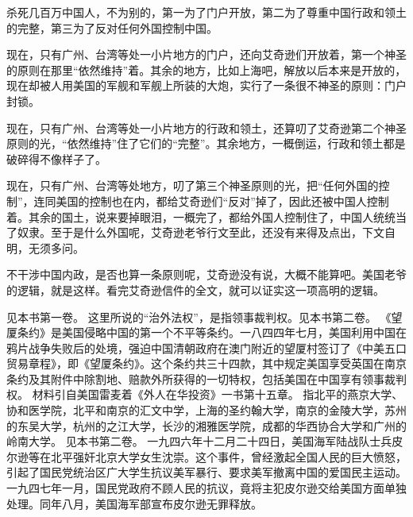 杀死几百万中国人，不为别的，第一为了门户开放，第二为了尊重中国行政和领土的完整，第三为了反对任何外国控制中国。

现在，只有广州、台湾等处一小片地方的门户，还向艾奇逊们开放着，第一个神圣的原则在那里“依然维持”着。其余的地方，比如上海吧，解放以后本来是开放的，现在却被人用美国的军舰和军舰上所装的大炮，实行了一条很不神圣的原则：门户封锁。

现在，只有广州、台湾等处一小片地方的行政和领土，还算叨了艾奇逊第二个神圣原则的光，“依然维持”住了它们的“完整”。其余地方，一概倒运，行政和领土都是破碎得不像样子了。

现在，只有广州、台湾等处地方，叨了第三个神圣原则的光，把“任何外国的控制”，连同美国的控制也在内，都给艾奇逊们“反对”掉了，因此还被中国人控制着。其余的国土，说来要掉眼泪，一概完了，都给外国人控制住了，中国人统统当了奴隶。至于是什么外国呢，艾奇逊老爷行文至此，还没有来得及点出，下文自明，无须多问。

不干涉中国内政，是否也算一条原则呢，艾奇逊没有说，大概不能算吧。美国老爷的逻辑，就是这样。看完艾奇逊信件的全文，就可以证实这一项高明的逻辑。


\begin{maonote}
见本书第一卷。
这里所说的“治外法权”，是指领事裁判权。见本书第二卷。
《望厦条约》是美国侵略中国的第一个不平等条约。一八四四年七月，美国利用中国在鸦片战争失败后的处境，强迫中国清朝政府在澳门附近的望厦村签订了《中美五口贸易章程》，即《望厦条约》。这个条约共三十四款，其中规定美国享受英国在南京条约及其附件中除割地、赔款外所获得的一切特权，包括美国在中国享有领事裁判权。
材料引自美国雷麦着《外人在华投资》一书第十五章。
指北平的燕京大学、协和医学院，北平和南京的汇文中学，上海的圣约翰大学，南京的金陵大学，苏州的东吴大学，杭州的之江大学，长沙的湘雅医学院，成都的华西协合大学和广州的岭南大学。
见本书第二卷。
一九四六年十二月二十四日，美国海军陆战队士兵皮尔逊等在北平强奸北京大学女生沈崇。这个事件，曾经激起全国人民的巨大愤怒，引起了国民党统治区广大学生抗议美军暴行、要求美军撤离中国的爱国民主运动。一九四七年一月，国民党政府不顾人民的抗议，竟将主犯皮尔逊交给美国方面单独处理。同年八月，美国海军部宣布皮尔逊无罪释放。
\end{maonote}

